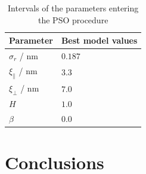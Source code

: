\documentclass{iucr}              %
\begin{document}
\begin{table}
\centering
\caption{Intervals of the parameters entering the PSO procedure}
\label{tbl:psd_results}
\begin{tabular}{@{}ll@{}}
\toprule
Parameter & Best model values\\ \midrule
$\sigma_r$ / nm & $0.187$ \\
$\xi_\parallel$ / nm& $3.3$ \\
$\xi_\perp$  / nm& $7.0$ \\
$H$ & $1.0$ \\
$\beta$ & $0.0$ \\
 \bottomrule
\end{tabular}
\end{table}

\section{Conclusions}
\end{document}
